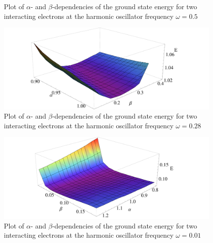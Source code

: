 \begin{appendix}
\begin{figure}
    \caption{Plot of $\alpha$- and $\beta$-dependencies of the ground state energy for two interacting electrons at the harmonic oscillator frequency $\omega=0.5$}
    \label{fig:ptwo05}
\end{figure}
\begin{figure}
    \centering
    \includegraphics[scale=0.36]{ptwo028}
    \caption{Plot of $\alpha$- and $\beta$-dependencies of the ground state energy for two interacting electrons at the harmonic oscillator frequency $\omega=0.28$}
    \label{fig:ptwo028}
\end{figure}
\begin{figure}
    \centering
    \includegraphics[scale=0.36]{ptwo001}
    \caption{Plot of $\alpha$- and $\beta$-dependencies of the ground state energy for two interacting electrons at the harmonic oscillator frequency $\omega=0.01$}
    \label{fig:ptwo001}
\end{figure}
\FloatBarrier

\end{appendix}
